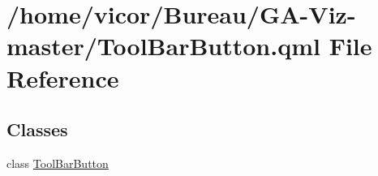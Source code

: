 \hypertarget{_tool_bar_button_8qml}{}\section{/home/vicor/\+Bureau/\+G\+A-\/\+Viz-\/master/\+Tool\+Bar\+Button.qml File Reference}
\label{_tool_bar_button_8qml}
\subsection*{Classes}
\begin{DoxyCompactItemize}
\item 
class \hyperlink{class_tool_bar_button}{Tool\+Bar\+Button}
\end{DoxyCompactItemize}
